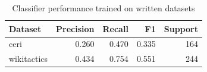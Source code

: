 \begin{table}[t]
\caption{Classifier performance trained on written datasets}
\label{tab:metrics}
\begin{tabular}{lrrrr}
\toprule
Dataset & Precision & Recall & F1 & Support \\
\midrule
ceri & 0.260 & 0.470 & 0.335 & 164 \\
wikitactics & 0.434 & 0.754 & 0.551 & 244 \\
\bottomrule
\end{tabular}
\end{table}
